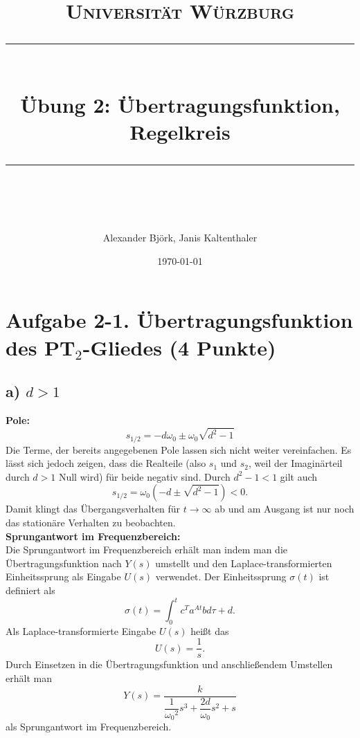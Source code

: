\documentclass[11pt]{scrartcl} %
\title{	
	\normalfont\normalsize
	\textsc{Universität Würzburg}\\ %
	\vspace{25pt} %
	\rule{\linewidth}{0.5pt}\\ %
	\vspace{20pt} %
	{\huge Übung 2: Übertragungsfunktion, Regelkreis}\\ %
	\vspace{12pt} %
	\rule{\linewidth}{2pt}\\ %
	\vspace{12pt} %
}
\author{\LARGE Alexander Björk, Janis Kaltenthaler} %
\date{\normalsize\today} %
\begin{document}
\maketitle %


\section*{Aufgabe 2-1. Übertragungsfunktion des PT$_2$-Gliedes (4 Punkte)}
\subsection*{a) $d>1$}
\textbf{Pole:}\\
\begin{equation*}
s_{1/2}=-d\omega_0\pm\omega_0\sqrt{d^2-1}
\end{equation*}
Die Terme, der bereits angegebenen Pole lassen sich nicht weiter vereinfachen. Es lässt sich jedoch zeigen, dass die Realteile (also $s_1$ und $s_2$, weil der Imaginärteil durch $d>1$ Null wird) für beide negativ sind.
Durch $d^2-1<1$ gilt auch
\begin{equation*}
s_{1/2}=\omega_0 \left( -d \pm \sqrt{d^2-1} \right) < 0.
\end{equation*}
Damit klingt das Übergangsverhalten für $t \rightarrow \infty$ ab und am Ausgang ist nur noch das stationäre Verhalten zu beobachten. \\

\textbf{Sprungantwort im Frequenzbereich:}\\
Die Sprungantwort im Frequenzbereich erhält man indem man die Übertragungsfunktion nach $Y(s)$ umstellt und den Laplace-transformierten Einheitssprung als Eingabe $U(s)$ verwendet. Der Einheitssprung $\sigma(t)$ ist definiert als
\begin{equation*}
\sigma(t)=\int_{0}^tc^Ta^{At}bd\tau + d.
\end{equation*}
Als Laplace-transformierte Eingabe $U(s)$ heißt das
\begin{equation*}
U(s) = \dfrac{1}{s}.
\end{equation*}
Durch Einsetzen in die Übertragungsfunktion und anschließendem Umstellen erhält man
\begin{equation*}
Y(s)=\dfrac{k}{\dfrac{1}{{\omega_0}^2}s^3+\dfrac{2d}{\omega_0}s^2+s}
\end{equation*}
als Sprungantwort im Frequenzbereich. \\
\end{document}
